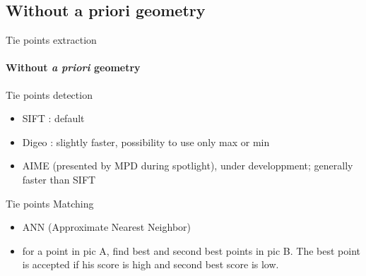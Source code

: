 \documentclass{beamer}
\begin{document}
\subsection{Without a priori geometry}
        \begin{frame}{Tie points extraction }
                \framesubtitle{Without \textit{a priori} geometry}
                \begin{block}{Tie points detection}
                        \begin{itemize}
                        \item SIFT : default
                        \item Digeo : slightly faster, possibility to use only max or min
                        \item AIME (presented by MPD during spotlight), under developpment; generally faster than SIFT
                        \end{itemize}
                \end{block}
\pause
                \begin{block}{Tie points Matching}
                \begin{itemize}
                        \item ANN (Approximate Nearest Neighbor)
                        \item for a point in pic A, find best and second best points in pic B.
                        The best point is accepted if his score is high and second best score is low.
                        \end{itemize}
                \end{block}
                
        \end{frame}
        
\end{document}

